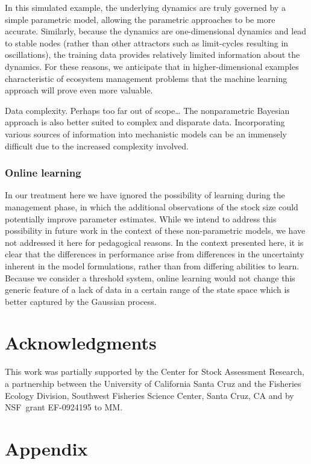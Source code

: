 \documentclass[author-year, review]{elsarticle} %
\begin{document}
In this simulated example, the underlying dynamics are truly governed by
a simple parametric model, allowing the parametric approaches to be more
accurate. Similarly, because the dynamics are one-dimensional dynamics
and lead to stable nodes (rather than other attractors such as
limit-cycles resulting in oscillations), the training data provides
relatively limited information about the dynamics. For these reasons, we
anticipate that in higher-dimensional examples characteristic of
ecosystem management problems that the machine learning approach will
prove even more valuable.

 Data complexity. Perhaps too far out of scope\ldots{} The nonparametric
Bayesian approach is also better suited to complex and disparate data.
Incorporating various sources of information into mechanistic models can
be an immensely difficult due to the increased complexity involved.

\subsubsection{Online learning}

In our treatment here we have ignored the possibility of learning during
the management phase, in which the additional observations of the stock
size could potentially improve parameter estimates. While we intend to
address this possibility in future work in the context of these
non-parametric models, we have not addressed it here for pedagogical
reasons. In the context presented here, it is clear that the differences
in performance arise from differences in the uncertainty inherent in the
model formulations, rather than from differing abilities to learn.
Because we consider a threshold system, online learning would not change
this generic feature of a lack of data in a certain range of the state
space which is better captured by the Gaussian process.

\section{Acknowledgments}

This work was partially supported by the Center for Stock Assessment
Research, a partnership between the University of California Santa Cruz
and the Fisheries Ecology Division, Southwest Fisheries Science Center,
Santa Cruz, CA and by NSF~grant EF-0924195 to MM.

\section{Appendix}
\end{document}
